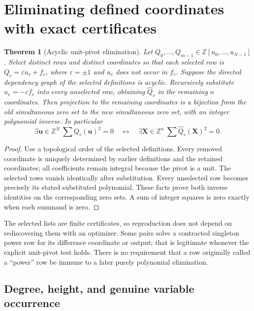 \documentclass[11pt]{article}
\newtheorem{theorem}{Theorem}[section]
\theoremstyle{definition}\newtheorem{definition}[theorem]{Definition}
\theoremstyle{remark}\newtheorem{remark}[theorem]{Remark}
\newcommand{\Z}{\mathbb Z}
\begin{document}
\section{Eliminating defined coordinates with exact certificates}
\label{sec:projection}

\begin{theorem}[Acyclic unit-pivot elimination]
Let $Q_0,\ldots,Q_{m-1}\in\Z[u_0,\ldots,u_{N-1}]$. Select distinct
rows and distinct coordinates so that each selected row is
$Q_r=\varepsilon u_v+f_v$, where $\varepsilon=\pm1$ and $u_v$ does
not occur in $f_v$. Suppose the directed dependency graph of the
selected definitions is acyclic. Recursively substitute
$u_v=-\varepsilon f_v$ into every unselected row, obtaining
$\widehat Q_r$ in the remaining $n$ coordinates. Then projection to the
remaining coordinates is a bijection from the old simultaneous zero
set to the new simultaneous zero set, with an integer polynomial inverse.
In particular
\[
\exists\mathbf u\in\Z^N\ \sum Q_r(\mathbf u)^2=0
\quad\longleftrightarrow\quad
\exists\mathbf X\in\Z^n\ \sum\widehat Q_r(\mathbf X)^2=0.
\]
\end{theorem}

\begin{proof}
Use a topological order of the selected definitions. Every removed
coordinate is uniquely determined by earlier definitions and the retained
coordinates; all coefficients remain integral because the pivot is a unit.
The selected rows vanish identically after substitution. Every unselected
row becomes precisely its stated substituted polynomial. These facts
prove both inverse identities on the corresponding zero sets. A sum of
integer squares is zero exactly when each summand is zero.
\end{proof}

The selected lists are finite certificates, so reproduction does not
depend on rediscovering them with an optimizer. Some pairs solve a
contracted singleton power row for its difference coordinate or output;
that is legitimate whenever the explicit unit-pivot test holds. There
is no requirement that a row originally called a ``power'' row be
immune to a later purely polynomial elimination.

\subsection{Degree, height, and genuine variable occurrence}
\end{document}
